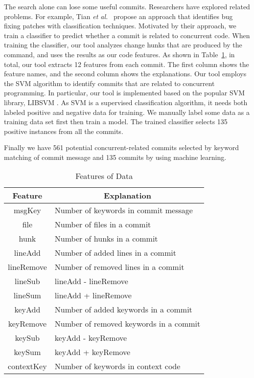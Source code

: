The search alone can lose some useful commits. Researchers have explored related problems. For example, Tian \emph{et al.}~\cite{tian2012identifying} propose an approach that identifies bug fixing patches with classification techniques. Motivated by their approach, we train a classifier to predict whether a commit is related to concurrent code. When training the classifier, our tool analyzes change hunks that are produced by the  command, and uses the results as our code features. As shown in Table~\ref{table:feature}, in total, our tool extracts 12 features from each commit. The first column shows the feature names, and the second column shows the explanations.
Our tool employs the SVM \cite{journals/ml/CortesV95} algorithm to identify commits that are related to concurrent programming. In particular, our tool is implemented based on the popular SVM library, LIBSVM \cite{libsvm}. As SVM is a supervised classification algorithm, it needs both labeled positive and negative data for training. We manually label some data as a training data set first then train a model. The trained classifier selects 135 positive instances from all the commits.


Finally we have 561 potential concurrent-related commits selected by keyword matching of commit message and 135 commits by using machine learning.

\begin{table}
	\centering
	\caption{Features of Data}
	\label{table:feature}
	\begin{tabular}{|c|l|}\hline
		Feature&\multicolumn{1}{|c|}{Explanation}\\\hline
		msgKey&Number of keywords in commit message\\
		file&Number of files in a commit\\
		hunk&Number of hunks in a commit\\
		lineAdd&Number of added lines in a commit\\
		lineRemove&Number of removed lines in a commit\\
		lineSub&lineAdd - lineRemove\\
		lineSum&lineAdd + lineRemove\\
		keyAdd&Number of added keywords in a commit\\
		keyRemove&Number of removed keywords in a commit\\
		keySub&keyAdd - keyRemove\\
		keySum&keyAdd + keyRemove\\
		contextKey&Number of keywords in context code\\\hline
	\end{tabular}
\end{table}

